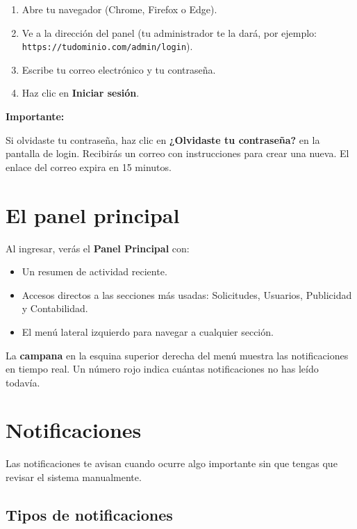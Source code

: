 \documentclass[12pt,a4paper]{article}
\newenvironment{importante}{%
  \begin{mdframed}[backgroundcolor=grayLight,linecolor=dangerColor,linewidth=1.5pt,innerleftmargin=10pt]
  \textcolor{dangerColor}{\textbf{Importante:}} 
}{%
  \end{mdframed}
}
\begin{document}
\begin{enumerate}
  \item Abre tu navegador (Chrome, Firefox o Edge).
  \item Ve a la dirección del panel (tu administrador te la dará, por ejemplo:\\
        \texttt{https://tudominio.com/admin/login}).
  \item Escribe tu correo electrónico y tu contraseña.
  \item Haz clic en \textbf{Iniciar sesión}.
\end{enumerate}

\begin{importante}
  Si olvidaste tu contraseña, haz clic en \textbf{¿Olvidaste tu contraseña?} en
  la pantalla de login. Recibirás un correo con instrucciones para crear una nueva.
  El enlace del correo expira en 15 minutos.
\end{importante}

\section{El panel principal}

Al ingresar, verás el \textbf{Panel Principal} con:
\begin{itemize}
  \item Un resumen de actividad reciente.
  \item Accesos directos a las secciones más usadas: Solicitudes, Usuarios,
        Publicidad y Contabilidad.
  \item El menú lateral izquierdo para navegar a cualquier sección.
\end{itemize}

La \textbf{campana} en la esquina superior derecha del menú muestra las
notificaciones en tiempo real. Un número rojo indica cuántas notificaciones
no has leído todavía.

\section{Notificaciones}

Las notificaciones te avisan cuando ocurre algo importante sin que tengas que
revisar el sistema manualmente.

\subsection{Tipos de notificaciones}
\end{document}
